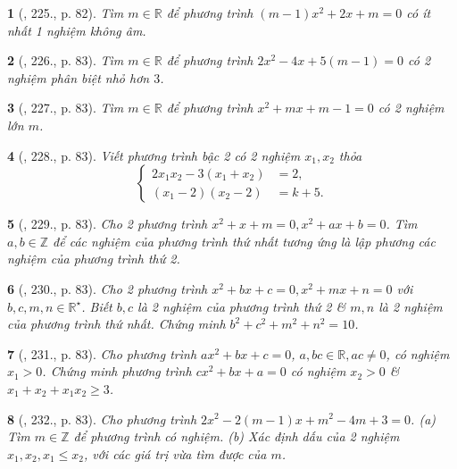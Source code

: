 \documentclass{article}
\newtheorem{baitoan}{}
\begin{document}
\begin{baitoan}[\cite{Tuyen_Toan_9_old}, 225., p. 82]
	Tìm $m\in\mathbb{R}$ để phương trình $(m - 1)x^2 + 2x + m = 0$ có ít nhất 1 nghiệm không âm.
\end{baitoan}

\begin{baitoan}[\cite{Tuyen_Toan_9_old}, 226., p. 83]
	Tìm $m\in\mathbb{R}$ để phương trình $2x^2 - 4x + 5(m - 1) = 0$ có 2 nghiệm phân biệt nhỏ hơn $3$.
\end{baitoan}

\begin{baitoan}[\cite{Tuyen_Toan_9_old}, 227., p. 83]
	Tìm $m\in\mathbb{R}$ để phương trình $x^2 + mx + m - 1 = 0$ có 2 nghiệm lớn $m$.
\end{baitoan}

\begin{baitoan}[\cite{Tuyen_Toan_9_old}, 228., p. 83]
	Viết phương trình bậc 2 có 2 nghiệm $x_1,x_2$ thỏa
	\begin{equation*}
		\left\{\begin{split}
			2x_1x_2 - 3(x_1 + x_2) &= 2,\\
			(x_1 - 2)(x_2 - 2) &= k + 5.
		\end{split}\right.
	\end{equation*}
\end{baitoan}

\begin{baitoan}[\cite{Tuyen_Toan_9_old}, 229., p. 83]
	Cho 2 phương trình $x^2 + x + m = 0,x^2 + ax + b = 0$. Tìm $a,b\in\mathbb{Z}$ để các nghiệm của phương trình thứ nhất tương ứng là lập phương các nghiệm của phương trình thứ 2.
\end{baitoan}

\begin{baitoan}[\cite{Tuyen_Toan_9_old}, 230., p. 83]
	Cho 2 phương trình $x^2 + bx + c = 0,x^2 + mx + n = 0$ với $b,c,m,n\in\mathbb{R}^\star$. Biết $b,c$ là 2 nghiệm của phương trình thứ 2 \& $m,n$ là 2 nghiệm của phương trình thứ nhất. Chứng minh $b^2 + c^2 + m^2 + n^2 = 10$.
\end{baitoan}

\begin{baitoan}[\cite{Tuyen_Toan_9_old}, 231., p. 83]
	Cho phương trình $ax^2 + bx + c = 0$, $a,bc\in\mathbb{R},ac\ne0$, có nghiệm $x_1 > 0$. Chứng minh phương trình $cx^2 + bx + a = 0$ có nghiệm $x_2 > 0$ \& $x_1 + x_2 + x_1x_2\ge3$.
\end{baitoan}

\begin{baitoan}[\cite{Tuyen_Toan_9_old}, 232., p. 83]
	Cho phương trình $2x^2 - 2(m - 1)x + m^2 - 4m + 3 = 0$. (a) Tìm $m\in\mathbb{Z}$ để phương trình có nghiệm. (b) Xác định dấu của 2 nghiệm $x_1,x_2,x_1\le x_2$, với các giá trị vừa tìm được của $m$.
\end{baitoan}
\end{document}
